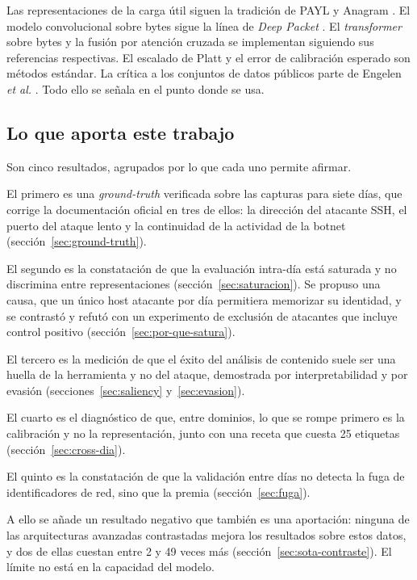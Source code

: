 Las representaciones de la carga útil siguen la tradición de PAYL y Anagram
\cite{Wang2004, Wang2006}. El modelo convolucional sobre bytes sigue la línea de
\emph{Deep Packet} \cite{Lotfollahi2020}. El \emph{transformer} sobre bytes y la
fusión por atención cruzada se implementan siguiendo sus referencias
respectivas. El escalado de Platt \cite{Platt1999} y el error de calibración
esperado \cite{Guo2017} son métodos estándar. La crítica a los conjuntos de
datos públicos parte de Engelen \emph{et al.} \cite{Engelen2021}. Todo ello se
señala en el punto donde se usa.

\subsection*{Lo que aporta este trabajo}

Son cinco resultados, agrupados por lo que cada uno permite afirmar.

El primero es una \emph{ground-truth} verificada sobre las capturas para siete
días, que corrige la documentación oficial en tres de ellos: la dirección del
atacante SSH, el puerto del ataque lento y la continuidad de la actividad de la
botnet (sección~\ref{sec:ground-truth}).

El segundo es la constatación de que la evaluación intra-día está saturada y no
discrimina entre representaciones (sección~\ref{sec:saturacion}). Se propuso una
causa, que un único host atacante por día permitiera memorizar su identidad, y
se contrastó y refutó con un experimento de exclusión de atacantes que incluye
control positivo (sección~\ref{sec:por-que-satura}).

El tercero es la medición de que el éxito del análisis de contenido suele ser
una huella de la herramienta y no del ataque, demostrada por interpretabilidad y
por evasión (secciones~\ref{sec:saliency} y~\ref{sec:evasion}).

El cuarto es el diagnóstico de que, entre dominios, lo que se rompe primero es
la calibración y no la representación, junto con una receta que cuesta 25
etiquetas (sección~\ref{sec:cross-dia}).

El quinto es la constatación de que la validación entre días no detecta la fuga
de identificadores de red, sino que la premia (sección~\ref{sec:fuga}).

A ello se añade un resultado negativo que también es una aportación: ninguna de
las arquitecturas avanzadas contrastadas mejora los resultados sobre estos
datos, y dos de ellas cuestan entre 2 y 49 veces más
(sección~\ref{sec:sota-contraste}). El límite no está en la capacidad del
modelo.

